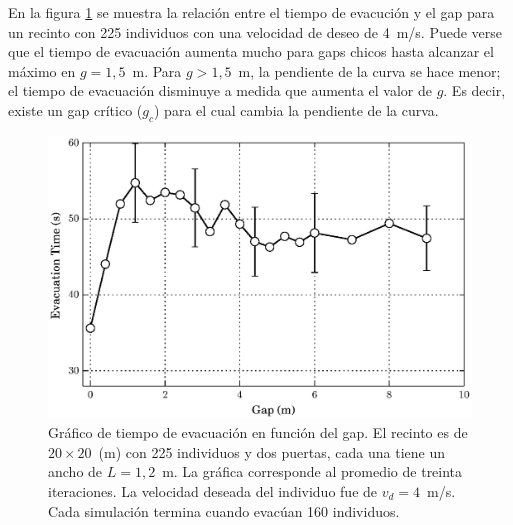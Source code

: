En la figura \ref{gap_vste_225_v4} se muestra la relación entre el tiempo de evacución y el gap para un recinto con 225 individuos con una velocidad de deseo de 4~m/s. Puede verse que el tiempo de evacuación aumenta mucho para gaps chicos hasta alcanzar el máximo en $g=1,5$~m. Para $g>1,5$~m, la pendiente de la curva se hace menor; el tiempo de evacuación disminuye a medida que aumenta el valor de $g$. 
Es decir, existe un gap crítico ($g_c$) para el cual cambia la pendiente de la curva.

\begin{figure}[H]
    \centering
    \includegraphics[scale=0.8]{figuras/gap_vste_225_v4_big.eps}
    \caption[width=5cm]{Gráfico de tiempo de evacuación en función del gap. El recinto es de $20\times 20$~(m) con 225 individuos y dos puertas, cada una tiene un ancho de $L=1,2$~m. La gráfica corresponde al promedio de treinta iteraciones. La velocidad deseada del individuo fue de $v_d=4$~m/s. Cada simulación termina cuando evacúan 160 individuos.}
    \label{gap_vste_225_v4}
\end{figure}


